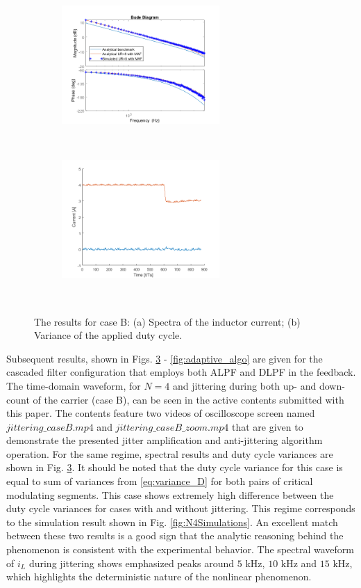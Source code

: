 \documentclass[journal]{IEEEtran}
\begin{document}
\begin{figure}[t!]
\centering
\begin{subfigure}{0.5\textwidth}
  \centering
  \includegraphics[width=0.95\linewidth, height = 45mm]{figures/nasDif_ollfra.png}
  \caption{}
  \label{fig:N430kHz_sub1}
\end{subfigure}\\
\begin{subfigure}{0.5\textwidth}
  \centering
  \includegraphics[width=0.95\linewidth, height = 45mm]{figures/nasDif_step_3Rs.png}
  \caption{}
  \label{fig:N430kHz_sub2}
\end{subfigure}\\
\caption{The results for case B: (a) Spectra of the inductor current; (b) Variance of the applied duty cycle.}
\label{fig:N430kHz}
\end{figure}

\noindent
Subsequent results, shown in Figs. \ref{fig:N430kHz} - \ref{fig:adaptive_algo} are given for the cascaded filter configuration that employs both ALPF and DLPF in the feedback. 
The time-domain waveform, for $N = 4$ and jittering during both up- and down-count of the carrier (case B), can be seen in the active contents submitted with this paper. The contents feature two videos of oscilloscope screen named $jittering\_ caseB.mp4$ and $jittering\_ caseB\_ zoom.mp4$ that are given to demonstrate the presented jitter amplification and anti-jittering algorithm operation.
For the same regime, spectral results and duty cycle variances are shown in Fig. \ref{fig:N430kHz}. It should be noted that the duty cycle variance for this case is equal to sum of variances from \eqref{eq:variance_D} for both pairs of critical modulating segments. This case shows extremely high difference between the duty cycle variances for cases with and without jittering.
This regime corresponds to the simulation result shown in Fig. \ref{fig:N4Simulations}. An excellent match between these two results is a good sign that the analytic reasoning behind the phenomenon is consistent with the experimental behavior. The spectral waveform of $i_L$ during jittering shows emphasized peaks around $5$ kHz, $10$ kHz and $15$ kHz, which highlights the deterministic nature of the nonlinear phenomenon.
\end{document}
